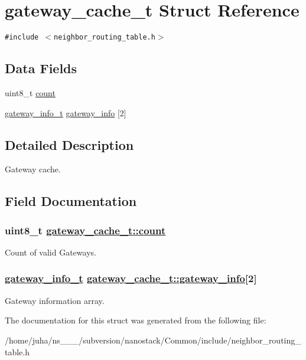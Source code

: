\hypertarget{structgateway__cache__t}{
\section{gateway\_\-cache\_\-t Struct Reference}
\label{structgateway__cache__t}
}
{\tt \#include $<$neighbor\_\-routing\_\-table.h$>$}

\subsection*{Data Fields}
\begin{CompactItemize}
\item 
uint8\_\-t \hyperlink{structgateway__cache__t_743d165f3fdaa99a0e1223a59004510b}{count}
\item 
\hyperlink{structgateway__info__t}{gateway\_\-info\_\-t} \hyperlink{structgateway__cache__t_410691be84519b759fd945c5e05d0be1}{gateway\_\-info} \mbox{[}2\mbox{]}
\end{CompactItemize}


\subsection{Detailed Description}
Gateway cache. 



\subsection{Field Documentation}
\hypertarget{structgateway__cache__t_743d165f3fdaa99a0e1223a59004510b}{
\subsubsection[count]{\setlength{\rightskip}{0pt plus 5cm}uint8\_\-t \hyperlink{structgateway__cache__t_743d165f3fdaa99a0e1223a59004510b}{gateway\_\-cache\_\-t::count}}}
\label{structgateway__cache__t_743d165f3fdaa99a0e1223a59004510b}


Count of valid Gateways. \hypertarget{structgateway__cache__t_410691be84519b759fd945c5e05d0be1}{
\subsubsection[gateway\_\-info]{\setlength{\rightskip}{0pt plus 5cm}\hyperlink{structgateway__info__t}{gateway\_\-info\_\-t} \hyperlink{structgateway__cache__t_410691be84519b759fd945c5e05d0be1}{gateway\_\-cache\_\-t::gateway\_\-info}\mbox{[}2\mbox{]}}}
\label{structgateway__cache__t_410691be84519b759fd945c5e05d0be1}


Gateway information array. 

The documentation for this struct was generated from the following file:\begin{CompactItemize}
\item 
/home/juha/ns\_\_\_/subversion/nanostack/Common/include/neighbor\_\-routing\_\-table.h\end{CompactItemize}
